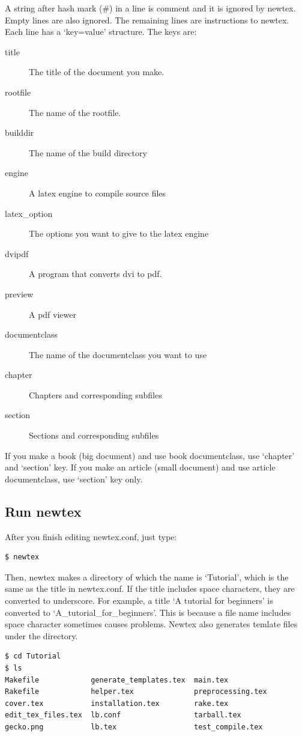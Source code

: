 A string after hash mark (\#) in a line is comment and it is ignored by newtex.
Empty lines are also ignored.
The remaining lines are instructions to newtex.
Each line has a `key=value' structure.
The keys are:
\begin{description}
\item[title] The title of the document you make.
\item[rootfile] The name of the rootfile.
\item[builddir] The name of the build directory
\item[engine] A latex engine to compile source files
\item[latex\_option] The options you want to give to the latex engine
\item[dvipdf] A program that converts dvi to pdf.
\item[preview] A pdf viewer
\item[documentclass] The name of the documentclass you want to use
\item[chapter] Chapters and corresponding subfiles
\item[section] Sections and corresponding subfiles
\end{description}
If you make a book (big document) and use book documentclass, use `chapter' and `section' key.
If you make an article (small document) and use article documentclass, use `section' key only.

\subsection{Run newtex}
After you finish editing newtex.conf, just type:
\begin{verbatim}
$ newtex
\end{verbatim}
Then, newtex makes a directory of which the name is `Tutorial', which is the same as the title in newtex.conf.
If the title includes space characters, they are converted to underscore.
For example, a title `A tutorial for beginners' is converted to `A\_tutorial\_for\_beginners'.
This is because a file name includes space character sometimes causes problems.
Newtex also generates temlate files under the directory.
\begin{verbatim}
$ cd Tutorial
$ ls
Makefile            generate_templates.tex  main.tex
Rakefile            helper.tex              preprocessing.tex
cover.tex           installation.tex        rake.tex
edit_tex_files.tex  lb.conf                 tarball.tex
gecko.png           lb.tex                  test_compile.tex
\end{verbatim}

